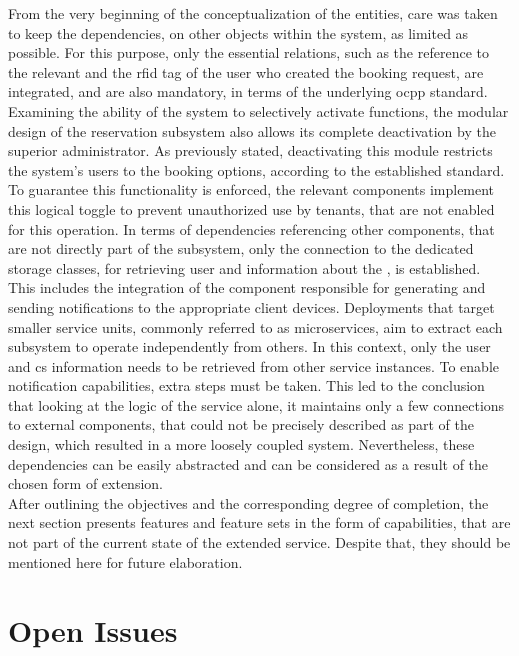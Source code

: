 From the very beginning of the conceptualization of the entities, care was taken to keep the dependencies, on other objects within the system, as limited as possible. For this purpose, only the essential relations, such as the reference to the relevant  and the \acrshort{rfid} tag of the user who created the booking request, are integrated, and are also mandatory, in terms of the underlying \acrshort{ocpp} standard.
Examining the ability of the system to selectively activate functions, the modular design of the reservation subsystem also allows its complete deactivation by the superior administrator. As previously stated, deactivating this module restricts the system's users to the booking options, according to the established standard.
To guarantee this functionality is enforced, the relevant components implement this logical toggle to prevent unauthorized use by tenants, that are not enabled for this operation.
In terms of dependencies referencing other components, that are not directly part of the subsystem, only the connection to the dedicated storage classes, for retrieving user and information about the , is established. This includes the integration of the component responsible for generating and sending notifications to the appropriate client devices.
Deployments that target smaller service units, commonly referred to as microservices, aim to extract each subsystem to operate independently from others. In this context, only the user and \acrshort{cs} information needs to be retrieved from other service instances. To enable notification capabilities, extra steps must be taken. 
This led to the conclusion that looking at the logic of the service alone, it maintains only a few connections to external components, that could not be precisely described as part of the design, which resulted in a more loosely coupled system. Nevertheless, these dependencies can be easily abstracted and can be considered as a result of the chosen form of extension. \\

\noindent After outlining the objectives and the corresponding degree of completion, the next section presents features and feature sets in the form of capabilities, that are not part of the current state of the extended service. Despite that, they should be mentioned here for future elaboration.

\section{Open Issues}
\label{ch:Analysis and Validation:sec:Open Issues}

